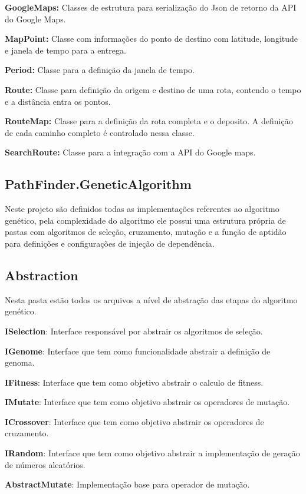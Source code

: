 \textbf{GoogleMaps:} Classes de estrutura para serialização do Json de retorno da API do Google Maps.

\textbf{MapPoint:} Classe com informações do ponto de destino com latitude, longitude e janela de tempo para a entrega.

\textbf{Period:} Classe para a definição da janela de tempo.

\textbf{Route:} Classe para definição da origem e destino de uma rota, contendo o tempo e a distância entra os pontos.

\textbf{RouteMap:} Classe para a definição da rota completa e o deposito. A definição de cada caminho completo é controlado nessa classe. 

\textbf{SearchRoute:} Classe para a integração com a API do Google maps.

\subsection{PathFinder.GeneticAlgorithm}
Neste projeto são definidos todas as implementações referentes ao algoritmo genético, pela complexidade do algoritmo ele possui uma estrutura própria de pastas com algoritmos de seleção, cruzamento, mutação e a função de aptidão para definições e configurações de injeção de dependência.

\subsection{Abstraction}

Nesta pasta estão todos os arquivos a nível de abstração das etapas do algoritmo genético.

\textbf{ISelection}: Interface responsável por abstrair os algoritmos de seleção.

\textbf{IGenome}: Interface que tem como funcionalidade abstrair a definição de genoma.

\textbf{IFitness}: Interface que tem como objetivo abstrair o calculo de fitness.

\textbf{IMutate}: Interface que tem como objetivo abstrair os operadores de mutação.

\textbf{ICrossover}:  Interface que tem como objetivo abstrair os operadores de cruzamento.

\textbf{IRandom}: Interface que tem como objetivo abstrair a implementação de geração de números aleatórios.

\textbf{AbstractMutate}: Implementação base para operador de mutação.

